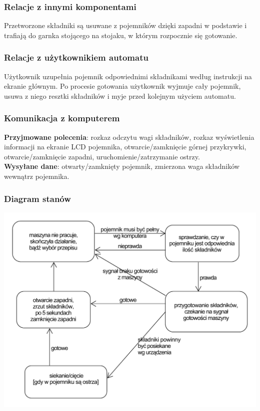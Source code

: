 \documentclass[12pt,a4paper,notitlepage]{article}
\begin{document}
\subsubsection{Relacje z innymi komponentami}
Przetworzone składniki są usuwane z pojemników dzięki zapadni w podstawie i trafiają do garnka stojącego na stojaku, w którym rozpocznie się gotowanie.

\subsubsection{Relacje z użytkownikiem automatu}
Użytkownik uzupełnia pojemnik odpowiednimi składnikami według instrukcji na ekranie głównym. Po procesie gotowania użytkownik wyjmuje cały pojemnik, usuwa z niego resztki składników i myje przed kolejnym użyciem automatu.

\subsubsection{Komunikacja z komputerem}
\textbf{Przyjmowane polecenia}: rozkaz odczytu wagi składników, rozkaz wyświetlenia informacji na ekranie LCD pojemnika, otwarcie/zamknięcie górnej przykrywki, otwarcie/zamknięcie zapadni, uruchomienie/zatrzymanie ostrzy.\\
\textbf{Wysyłane dane}: otwarty/zamknięty pojemnik, zmierzona waga składników wewnątrz pojemnika.

\subsubsection{Diagram stanów}
\includegraphics[width=\textwidth,height=\textheight,keepaspectratio=true]{Diagram-stanow-pojemnik.pdf}
\end{document}
